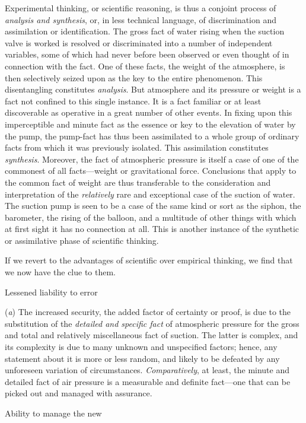 \documentclass[letterpaper]{book}
\begin{document}
Experimental thinking, or scientific reasoning, is thus a conjoint
process of \emph{analysis and synthesis}, or, in less technical
language, of discrimination and assimilation or identification. The
gross fact of water rising when the suction valve is worked is resolved
or discriminated into a number of independent variables, some of which
had never before been observed or even thought of in connection with the
fact. One of these facts, the weight of the atmosphere, is then
selectively seized upon as the key to the entire phenomenon. This
disentangling constitutes \emph{analysis}. But atmosphere and its
pressure or weight is a fact not confined to this single instance. It is
a fact familiar or at least discoverable as operative in a great number
of other events. In fixing upon this imperceptible and minute fact as
the essence or key to the elevation of water by the pump, the pump-fact
has thus been assimilated to a whole group of ordinary facts from which
it was previously isolated. This assimilation constitutes
\emph{synthesis}. Moreover, the fact of atmospheric pressure is itself a
case of one of the commonest of all facts---weight or gravitational
force. Conclusions that apply to the common fact of weight are thus
transferable to the consideration and interpretation of the
\emph{relatively} rare and exceptional case of the suction of water. The
suction pump is seen to be a case of the same kind or sort as the
siphon,
the
barometer, the rising of the balloon, and a multitude of other things
with which at first sight it has no connection at all. This is another
instance of the synthetic or assimilative phase of scientific thinking.

If we revert to the advantages of scientific over empirical thinking, we
find that we now have the clue to them.

Lessened liability to error

(\emph{a}) The increased security, the added factor of certainty or
proof, is due to the substitution of the \emph{detailed and specific
fact} of atmospheric pressure for the gross and total and relatively
miscellaneous fact of suction. The latter is complex, and its complexity
is due to many unknown and unspecified factors; hence, any statement
about it is more or less random, and likely to be defeated by any
unforeseen variation of circumstances. \emph{Comparatively}, at least,
the minute and detailed fact of air pressure is a measurable and
definite fact---one that can be picked out and managed with assurance.

Ability to manage the new
\end{document}
